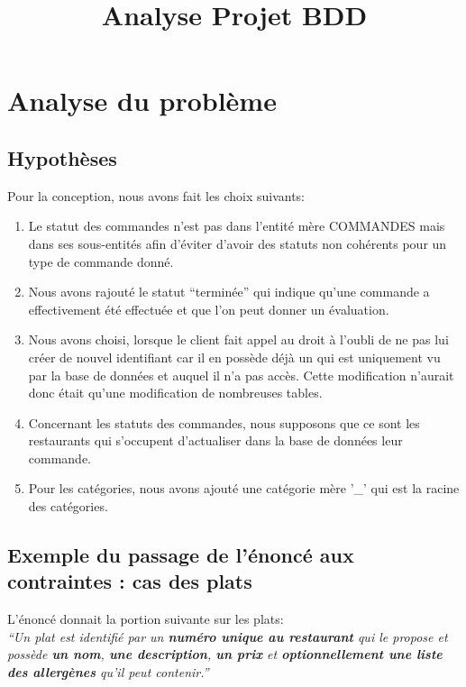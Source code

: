 \documentclass[10pt, a4paper]{article}
\title{Analyse Projet BDD}
\date{}
\begin{document}
\maketitle
\tableofcontents
\newpage

\section{Analyse du problème}
\subsection{Hypothèses}
Pour la conception, nous avons fait les choix suivants:
\begin{enumerate}
    \item Le statut des commandes n'est pas dans l'entité mère COMMANDES
          mais dans ses sous-entités afin d'éviter d'avoir des statuts non cohérents
          pour un type de commande donné.
    \item Nous avons rajouté le statut ``terminée'' qui indique qu'une
          commande a effectivement été effectuée et que l'on peut donner un
          évaluation.
    \item Nous avons choisi, lorsque le client fait appel au droit à l'oubli de ne pas lui créer de nouvel identifiant car il en possède déjà
          un qui est uniquement vu par la base de données et auquel il n'a pas accès. Cette modification n'aurait donc était qu'une modification de nombreuses tables.
    \item Concernant les statuts des commandes, nous supposons que ce sont les restaurants qui s'occupent d'actualiser dans la base de données leur commande.
    \item Pour les catégories, nous avons ajouté une catégorie mère '\_' qui est la racine des catégories.
\end{enumerate}

\subsection{Exemple du passage de l'énoncé aux contraintes : cas des plats}
L'énoncé donnait la portion suivante sur les plats:
\\

\textit{``Un plat est identifié par un \textbf{numéro unique au restaurant} qui le propose et possède \textbf{un nom}, \textbf{une description},
\textbf{un prix} et \textbf{optionnellement une liste des allergènes} qu’il peut contenir.''}
\\
\end{document}
